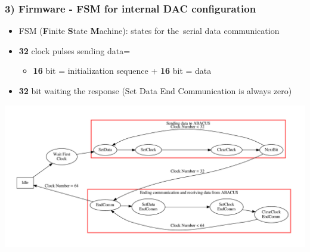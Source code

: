\documentclass[aspectratio=169]{beamer}
\begin{document}
	\begin{frame}%
		\frametitle{3) Firmware - FSM for internal DAC configuration}
		\begin{itemize}
			\item FSM (\textbf{F}inite \textbf{S}tate \textbf{M}achine): states for the~serial data communication
			\item \textbf{32} clock pulses sending data=
			\begin{itemize}
				\item \textbf{16} bit = initialization sequence + \textbf{16} bit = data
			\end{itemize}
			\item \textbf{32} bit waiting the response (Set Data End Communication is always zero)
		\end{itemize}
		\begin{center}
			\includegraphics[width=0.85 \textwidth]{IMG2/InternalDACsFSM.pdf}
		\end{center}
	\end{frame}


\end{document}
